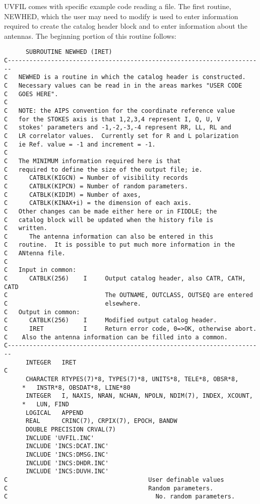 UVFIL comes with specific example code reading  a file. The first
routine, NEWHED, which the user may need to modify is used to enter
information required to create the catalog header block and to enter
information about the antennas. The beginning portion of this routine
follows:
\begin{verbatim}
      SUBROUTINE NEWHED (IRET)
C-----------------------------------------------------------------------
C   NEWHED is a routine in which the catalog header is constructed.
C   Necessary values can be read in in the areas markes "USER CODE
C   GOES HERE".
C
C   NOTE: the AIPS convention for the coordinate reference value
C   for the STOKES axis is that 1,2,3,4 represent I, Q, U, V
C   stokes' parameters and -1,-2,-3,-4 represent RR, LL, RL and
C   LR correlator values.  Currently set for R and L polarization
C   ie Ref. value = -1 and increment = -1.
C
C   The MINIMUM information required here is that
C   required to define the size of the output file; ie.
C      CATBLK(KIGCN) = Number of visibility records
C      CATBLK(KIPCN) = Number of random parameters.
C      CATBLK(KIDIM) = Number of axes,
C      CATBLK(KINAX+i) = the dimension of each axis.
C   Other changes can be made either here or in FIDDLE; the
C   catalog block will be updated when the history file is
C   written.
C      The antenna information can also be entered in this
C   routine.  It is possible to put much more information in the
C   ANtenna file.
C
C   Input in common:
C      CATBLK(256)    I     Output catalog header, also CATR, CATH, CATD
C                           The OUTNAME, OUTCLASS, OUTSEQ are entered
C                           elsewhere.
C   Output in common:
C      CATBLK(256)    I     Modified output catalog header.
C      IRET           I     Return error code, 0=>OK, otherwise abort.
C    Also the antenna information can be filled into a common.
C-----------------------------------------------------------------------
      INTEGER   IRET
C
      CHARACTER RTYPES(7)*8, TYPES(7)*8, UNITS*8, TELE*8, OBSR*8,
     *   INSTR*8, OBSDAT*8, LINE*80
      INTEGER   I, NAXIS, NRAN, NCHAN, NPOLN, NDIM(7), INDEX, XCOUNT,
     *   LUN, FIND
      LOGICAL   APPEND
      REAL      CRINC(7), CRPIX(7), EPOCH, BANDW
      DOUBLE PRECISION CRVAL(7)
      INCLUDE 'UVFIL.INC'
      INCLUDE 'INCS:DCAT.INC'
      INCLUDE 'INCS:DMSG.INC'
      INCLUDE 'INCS:DHDR.INC'
      INCLUDE 'INCS:DUVH.INC'
C                                       User definable values
C                                       Random parameters.
C                                         No. random parameters.

\end{verbatim}
